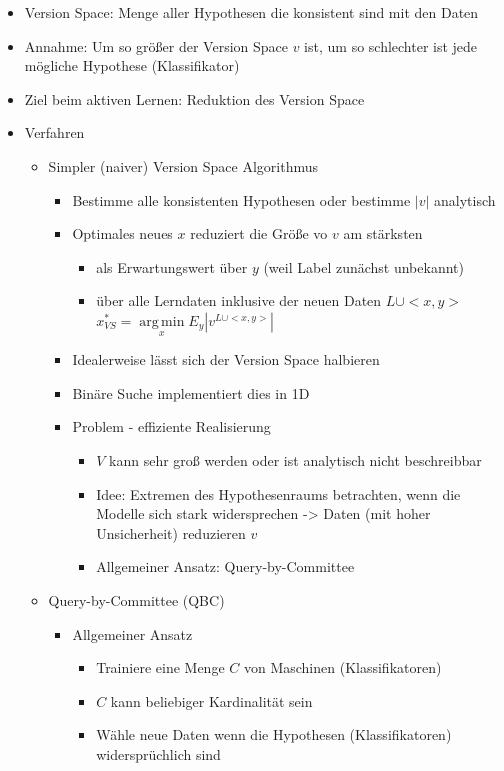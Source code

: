 \documentclass[paper=a4, fontsize=11pt]{scrartcl} %
\numberwithin{equation}{section} %
\numberwithin{figure}{section} %
\numberwithin{table}{section} %
\DeclareMathOperator*{\argmin}{arg\,min}
\begin{document}
\begin{itemize}
\item Version Space: Menge aller Hypothesen die konsistent sind mit den Daten
\item Annahme: Um so größer der Version Space $v$ ist, um so schlechter ist jede mögliche Hypothese (Klassifikator)
\item Ziel beim aktiven Lernen: Reduktion des Version Space
\item Verfahren
\begin{itemize}
\item Simpler (naiver) Version Space Algorithmus
\begin{itemize}
\item Bestimme alle konsistenten Hypothesen oder bestimme $|v|$ analytisch
\item Optimales neues $x$ reduziert die Größe vo $v$ am stärksten
\begin{itemize}
\item als Erwartungswert über $y$ (weil Label zunächst unbekannt)
\item über alle Lerndaten inklusive der neuen Daten $L \cup <x,y>$ \\ $x^*_{VS} = \argmin\limits_x E_y |v^{L \cup <x,y>}|$
\end{itemize}
\item Idealerweise lässt sich der Version Space halbieren
\item Binäre Suche implementiert dies in 1D
\item Problem - effiziente Realisierung
\begin{itemize}
\item $V$ kann sehr groß werden oder ist analytisch nicht beschreibbar
\item Idee: Extremen des Hypothesenraums betrachten, wenn die Modelle sich stark widersprechen -> Daten (mit hoher Unsicherheit) reduzieren $v$
\item Allgemeiner Ansatz: Query-by-Committee
\end{itemize}
\end{itemize}
\item Query-by-Committee (QBC)
\begin{itemize}
\item Allgemeiner Ansatz
\begin{itemize}
\item Trainiere eine Menge $C$ von Maschinen (Klassifikatoren)
\item $C$ kann beliebiger Kardinalität sein
\item Wähle neue Daten wenn die Hypothesen (Klassifikatoren) widersprüchlich sind

\end{itemize}
\end{itemize}
\end{itemize}
\end{itemize}
\end{document}
